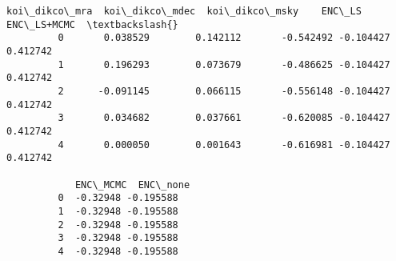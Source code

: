 \documentclass[11pt]{article}
\begin{document}
\begin{Verbatim}[commandchars=\\\{\}]
            koi\_dikco\_mra  koi\_dikco\_mdec  koi\_dikco\_msky    ENC\_LS  ENC\_LS+MCMC  \textbackslash{}
         0       0.038529        0.142112       -0.542492 -0.104427     0.412742   
         1       0.196293        0.073679       -0.486625 -0.104427     0.412742   
         2      -0.091145        0.066115       -0.556148 -0.104427     0.412742   
         3       0.034682        0.037661       -0.620085 -0.104427     0.412742   
         4       0.000050        0.001643       -0.616981 -0.104427     0.412742   
         
            ENC\_MCMC  ENC\_none  
         0  -0.32948 -0.195588  
         1  -0.32948 -0.195588  
         2  -0.32948 -0.195588  
         3  -0.32948 -0.195588  
         4  -0.32948 -0.195588  
\end{Verbatim}
            

    
    
    
    
\end{document}
